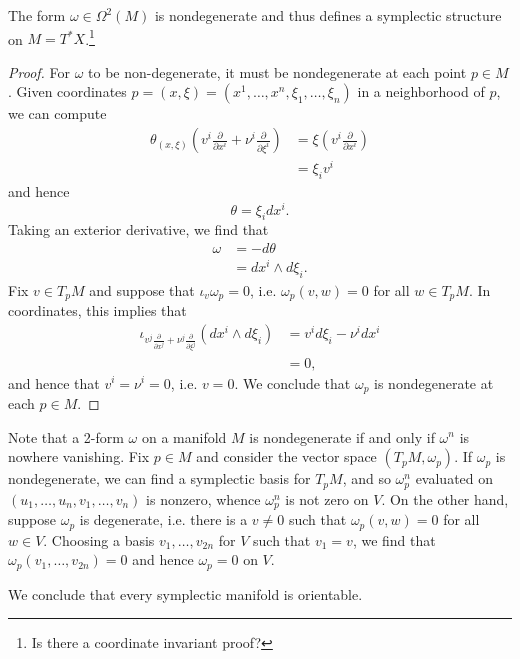 \documentclass{amsart}
\begin{document}
\begin{proposition}
    The form $\omega\in\Omega^2(M)$ is nondegenerate and thus defines a symplectic structure on
    $M=T^*X$.\footnote{Is there a coordinate invariant proof?}
\end{proposition}
\begin{proof}
    For $\omega$ to be non-degenerate, it must be nondegenerate at each point $p\in M$. Given
    coordinates $p=(x,\xi)=(x^1,\ldots,x^n,\xi_1,\ldots,\xi_n)$ in a neighborhood of $p$, we can
    compute
    \begin{align*}
        \theta_{(x,\xi)}\left( v^i\frac{\partial}{\partial x^i} + \nu^i\frac{\partial}{\partial\xi^i} \right)
        &= \xi\left( v^i\frac{\partial}{\partial x^i} \right) \\
        &= \xi_iv^i
    \end{align*}
    and hence
    \begin{equation*}
        \theta = \xi_i dx^i.
    \end{equation*}
    Taking an exterior derivative, we find that
    \begin{align*}
        \omega &= - d\theta \\
        &= dx^i\wedge d\xi_i.
    \end{align*}
    Fix $v\in T_pM$ and suppose that $\iota_v\omega_p=0$, i.e. $\omega_p(v,w)=0$
    for all $w\in T_pM$. In coordinates, this implies that
    \begin{align*}
        \iota_{v^j\frac{\partial}{\partial x^j}+\nu^j\frac{\partial}{\partial\xi^j}}(dx^i\wedge d\xi_i)
        &= v^id\xi_i-\nu^idx^i\\
        &=0,
    \end{align*}
    and hence that $v^i=\nu^i=0$, i.e. $v=0$. We conclude that $\omega_p$ is nondegenerate at each $p\in M$.
\end{proof}

\begin{remark}
    Note that a 2-form $\omega$ on a manifold $M$ is nondegenerate if and only if $\omega^n$ is
    nowhere vanishing. Fix $p\in M$ and consider the vector space $(T_pM, \omega_p)$. If
    $\omega_p$ is nondegenerate, we can find a symplectic basis for $T_pM$, and so $\omega_p^n$
    evaluated on $(u_1,\ldots,u_n,v_1,\ldots ,v_n)$ is nonzero, whence $\omega_p^n$ is not zero
    on $V$. On the other hand, suppose $\omega_p$ is degenerate, i.e. there is a $v\neq0$ such
    that $\omega_p(v,w)=0$ for all $w\in V$. Choosing a basis $v_1,\ldots,v_{2n}$ for $V$ such
    that $v_1=v$, we find that $\omega_p(v_1,\ldots,v_{2n})=0$ and hence $\omega_p=0$ on $V$.

    We conclude that every symplectic manifold is orientable.
    \label{rem:nondeg}
\end{remark}
\end{document}
